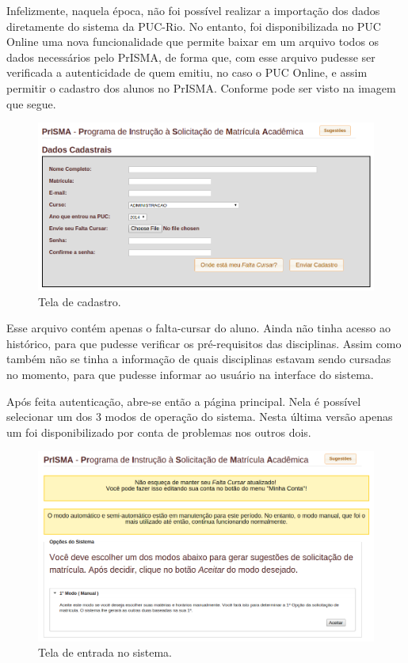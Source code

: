 \documentclass[graduacao,brazil]{ThesisPUC}
\begin{document}
Infelizmente, naquela época, não foi possível realizar a importação dos dados diretamente do sistema da PUC-Rio. No entanto, foi disponibilizada no PUC Online uma nova funcionalidade que permite baixar em um arquivo todos os dados necessários pelo PrISMA, de forma que, com esse arquivo pudesse ser verificada a autenticidade de quem emitiu, no caso o PUC Online, e assim permitir o cadastro dos alunos no PrISMA. Conforme pode ser visto na imagem que segue.

\begin{figure}[H]
    \centering
    \includegraphics[width=\linewidth]{img/v2_cadastro.png}
    \caption{Tela de cadastro.}
\end{figure}

Esse arquivo contém apenas o falta-cursar do aluno. Ainda não tinha acesso ao histórico, para que pudesse verificar os pré-requisitos das disciplinas. Assim como também não se tinha a informação de quais disciplinas estavam sendo cursadas no momento, para que pudesse informar ao usuário na interface do sistema.

Após feita autenticação, abre-se então a página principal. Nela é possível selecionar um dos 3 modos de operação do sistema. Nesta última versão apenas um foi disponibilizado por conta de problemas nos outros dois.

\begin{figure}[H]
    \centering
    \includegraphics[width=\linewidth]{img/v2_main.png}
    \caption{Tela de entrada no sistema.}
\end{figure}
\end{document}
